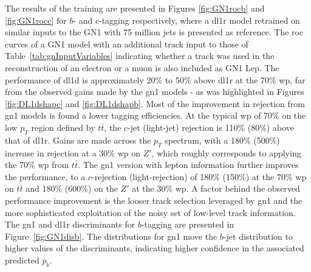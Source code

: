 The results of the training are presented in Figures \ref{fig:GN1rocb} and \ref{fig:GN1rocc} for $b$- and $c$-tagging respectively, where a \gls{dl1r} model retrained on similar inputs to the GN1 with 75 million jets is presented as reference. The \gls{roc} curves of a GN1 model with an additional track input to those of Table~\ref{tab:gnInputVariables} indicating whether a track was used in the reconstruction of an electron or a muon is also included as GN1 Lep. The performance of \gls{dl1d} is approximately 20\% to 50\% above \gls{dl1r} at the 70\% \gls{wp}, far from the observed gains made by the \gls{gn1} models - as was highlighted in Figures \ref{fig:DL1dshapc} and \ref{fig:DL1dshapb}. Most of the improvement in rejection from \gls{gn1} models is found a lower tagging efficiencies. At the typical \gls{wp} of 70\% on the low $p_T$ region defined by $t\bar{t}$, the $c$-jet (light-jet) rejection is 110\% (80\%) above that of \gls{dl1r}. Gains are made across the  $p_T$ spectrum, with a 180\% (500\%) increase in rejection at a 30\% \gls{wp} on $Z'$, which roughly corresponds to applying the 70\% \gls{wp} from $t\bar{t}$. The \gls{gn1} version with lepton information further improves the performance, to a $c$-rejection (light-rejection) of 180\% (150\%) at the 70\% \gls{wp} on $t\bar{t}$ and 180\% (600\%) on the $Z'$ at the 30\% \gls{wp}. A factor behind the observed performance improvement is the looser track selection leveraged by \gls{gn1} and the more sophisticated exploitation of the noisy set of low-level track information. The \gls{gn1} and \gls{dl1r} discriminants for $b$-tagging are presented in Figure~\ref{fig:GN1disb}. The distributions for \gls{gn1} move the $b$-jet distribution to higher values of the discriminants, indicating higher confidence in the associated predicted $p_b$. \\

